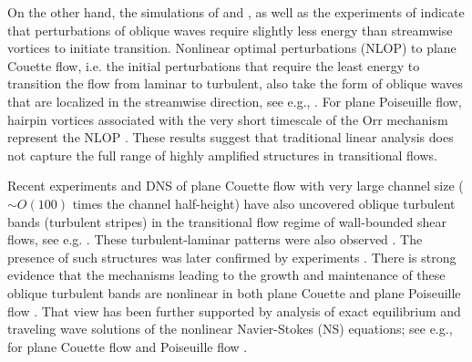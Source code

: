 On the other hand, the simulations of \citet{schmid1992new} and \citet{reddy1998stability}, as well as the experiments of  \cite{elofsson1998experimental} indicate that perturbations of oblique waves require slightly less energy than streamwise vortices to initiate transition.  Nonlinear optimal perturbations (NLOP) to plane Couette flow, i.e. the initial perturbations that require the least energy to transition the flow from  laminar to turbulent, also take the form of oblique waves that are localized in the streamwise direction, see e.g., \citep{duguet2010towards,Duguet2013,Monokrousos2011,rabin2012triggering,cherubini2013nonlinear,cherubini2015minimal}. For plane Poiseuille flow, hairpin vortices associated with the very short timescale of the Orr mechanism represent the NLOP \citep{farano2015hairpin,farano2016subcritical}. These results suggest that traditional linear analysis does not capture the full range of highly amplified structures in transitional flows.

Recent experiments and DNS of plane Couette flow with very large channel size ($\sim O(100)$ times the channel half-height) have also uncovered oblique turbulent bands (turbulent stripes) in the transitional flow regime of wall-bounded shear flows, see e.g. \citep{prigent2002large,prigent2003long, duguet2010formation,de2020transient,tuckerman2020patterns}. These turbulent-laminar patterns were also observed  \citep{tsukahara2005dns,xiong2015turbulent,tao2018extended,kanazawa2018lifetime,shimizu2019bifurcations,xiao2020growth,song2020trigger}. The presence of such structures was later confirmed by experiments \citep[figure 1]{tsukahara2014experimental,paranjape2019onset,paranjape2020oblique}. There is strong evidence that the mechanisms leading to the growth and maintenance of these oblique turbulent bands are nonlinear in both plane Couette \citep{barkley2007mean,tuckerman2011patterns,duguet2013oblique} and plane Poiseuille flow \citep{tuckerman2014turbulent}. That view has been further supported by analysis of 
exact equilibrium and traveling wave solutions of the nonlinear Navier-Stokes (NS) equations; see e.g., for plane Couette flow \citep{deguchi2015asymptotic,reetz2019exact} and Poiseuille flow \citep{paranjape2020oblique}.







